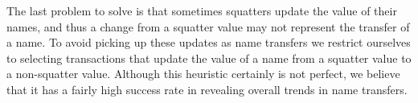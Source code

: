 The last problem to solve is that sometimes squatters update the value of their names, and thus a change from a squatter value may not represent the transfer of a name. To avoid picking up these updates as name transfers we restrict ourselves to selecting transactions that update the value of a name from a squatter value to a non-squatter value. Although this heuristic certainly is not perfect, we believe that it has a fairly high success rate in revealing overall trends in name transfers.

\textbf{}
	